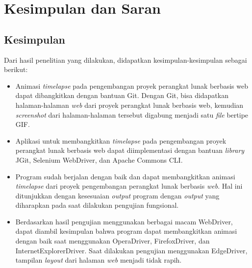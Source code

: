 \chapter{Kesimpulan dan Saran}
\label{chap:kesimpulan_dan_saran}

\section{Kesimpulan}
\label{sec:kesimpulan}
Dari hasil penelitian yang dilakukan, didapatkan kesimpulan-kesimpulan sebagai berikut:
\begin{itemize}
\item Animasi \textit{timelapse} pada pengembangan proyek perangkat lunak berbasis web dapat dibangkitkan dengan bantuan Git. Dengan Git, bisa didapatkan halaman-halaman \textit{web} dari proyek perangkat lunak berbasis web, kemudian \textit{screenshot} dari halaman-halaman tersebut digabung menjadi satu \textit{file} bertipe GIF.
\item  Aplikasi untuk membangkitkan \textit{timelapse} pada pengembangan proyek perangkat lunak berbasis web dapat diimplementasi dengan bantuan \textit{library} JGit, Selenium WebDriver, dan Apache Commons CLI.
\item Program sudah berjalan dengan baik dan dapat membangkitkan animasi \textit{timelapse} dari proyek pengembangan perangkat lunak berbasis \textit{web}. Hal ini ditunjukkan dengan kesesuaian \textit{output} program dengan \textit{output} yang diharapkan pada saat dilakukan pengujian fungsional.
\item Berdasarkan hasil pengujian menggunakan berbagai macam WebDriver, dapat diambil kesimpulan bahwa program dapat membangkitkan animasi dengan baik saat menggunakan OperaDriver, FirefoxDriver, dan InternetExplorerDriver. Saat dilakukan pengujian menggunakan EdgeDriver, tampilan \textit{layout} dari halaman \textit{web} menjadi tidak rapih.


\end{itemize}
